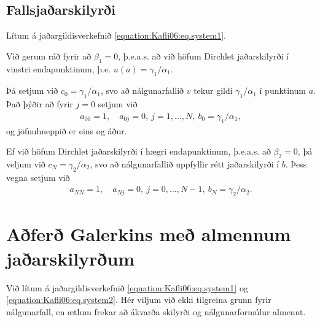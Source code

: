\documentclass[a4paper,10pt,icelandic]{sphinxmanual}
\begin{document}
\subsection{Fallsjaðarskilyrði}
\label{\detokenize{Kafli06:fallsjaarskilyri}}
Lítum á jaðargildisverkefnið \eqref{equation:Kafli06:eq.system1}.

Við gerum ráð fyrir að \(\beta_1=0\), þ.e.a.s. að við höfum Dirchlet jaðarskilyrði í vinstri endapunktinum, þ.e. \(u(a)=\gamma_1/\alpha_1\).

Þá  setjum við \(c_0=\gamma_1/\alpha_1\), svo að nálgunarfallið \(v\) tekur gildi \(\gamma_1/\alpha_1\) í punktinum \(a\).
Það þýðir að fyrir \(j=0\) setjum við
\begin{equation*}
\begin{split}a_{00}=1, \quad a_{0j}=0, \ j=1,\dots,N, \ b_0=\gamma_1/\alpha_1,\end{split}
\end{equation*}
og jöfnuhneppið er eins og áður.

Ef við höfum Dirchlet jaðarskilyrði í hægri endapunktinum, þ.e.a.s. að \(\beta_2=0\), þá veljum við \(c_N=\gamma_2/\alpha_2\), svo að nálgunarfallið uppfyllir rétt jaðarskilyrði í \(b\).
Þess vegna setjum við
\begin{equation*}
\begin{split}a_{NN}=1, \quad a_{Nj}=0, \ j=0,\dots,N-1, \ b_N=\gamma_2/\alpha_2.\end{split}
\end{equation*}

\section{Aðferð Galerkins með almennum jaðarskilyrðum}
\label{\detokenize{Kafli06:afer-galerkins-me-almennum-jaarskilyrum}}
Við lítum á jaðargildisverkefnið \eqref{equation:Kafli06:eq.system1} og \eqref{equation:Kafli06:eq.system2}. Hér viljum við ekki tilgreina grunn fyrir nálgunarfall, en  ætlum frekar að ákvarða skilyrði og nálgunarformúlur almennt.
\end{document}
